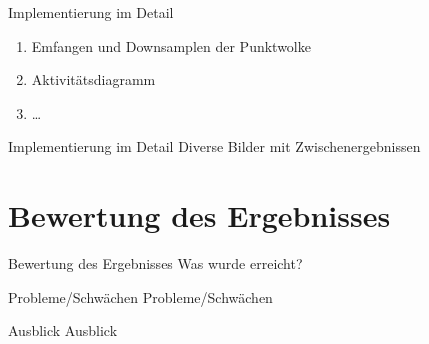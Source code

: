 \documentclass[18pt]{beamer}
\begin{document}
\begin{frame}{Implementierung im Detail}
\begin{enumerate}
	\item Emfangen und Downsamplen der Punktwolke
	\item Aktivitätsdiagramm
	\item \dots
\end{enumerate}
\end{frame}

\begin{frame}{Implementierung im Detail}
Diverse Bilder mit Zwischenergebnissen
\end{frame}



\section{Bewertung des Ergebnisses}

\begin{frame}{Bewertung des Ergebnisses}
Was wurde erreicht?
\end{frame}

\begin{frame}{Probleme/Schwächen}
Probleme/Schwächen
\end{frame}

\begin{frame}{Ausblick}
Ausblick
\end{frame}







\end{document}
